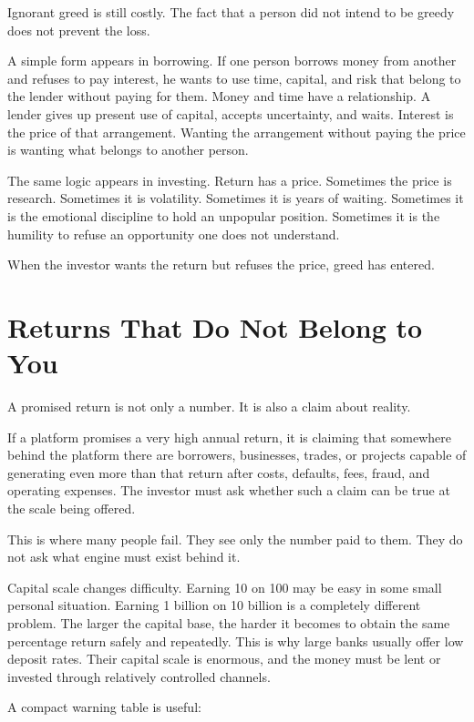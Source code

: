 Ignorant greed is still costly. The fact that a person did not intend to be greedy does not prevent the loss.

A simple form appears in borrowing. If one person borrows money from another and refuses to pay interest, he wants to use time, capital, and risk that belong to the lender without paying for them. Money and time have a relationship. A lender gives up present use of capital, accepts uncertainty, and waits. Interest is the price of that arrangement. Wanting the arrangement without paying the price is wanting what belongs to another person.

The same logic appears in investing. Return has a price. Sometimes the price is research. Sometimes it is volatility. Sometimes it is years of waiting. Sometimes it is the emotional discipline to hold an unpopular position. Sometimes it is the humility to refuse an opportunity one does not understand.

When the investor wants the return but refuses the price, greed has entered.

\section*{Returns That Do Not Belong to You}

A promised return is not only a number. It is also a claim about reality.

If a platform promises a very high annual return, it is claiming that somewhere behind the platform there are borrowers, businesses, trades, or projects capable of generating even more than that return after costs, defaults, fees, fraud, and operating expenses. The investor must ask whether such a claim can be true at the scale being offered.

This is where many people fail. They see only the number paid to them. They do not ask what engine must exist behind it.

Capital scale changes difficulty. Earning 10 on 100 may be easy in some small personal situation. Earning 1 billion on 10 billion is a completely different problem. The larger the capital base, the harder it becomes to obtain the same percentage return safely and repeatedly. This is why large banks usually offer low deposit rates. Their capital scale is enormous, and the money must be lent or invested through relatively controlled channels.

A compact warning table is useful:


